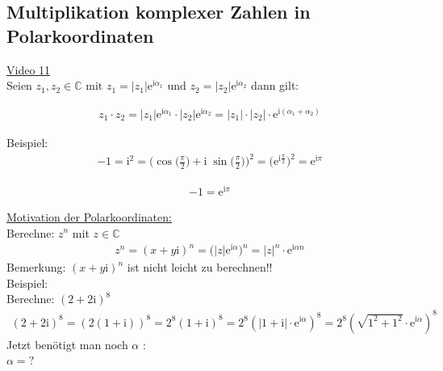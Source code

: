 \subsection{Multiplikation komplexer Zahlen in Polarkoordinaten}
\href{https://youtu.be/4eKWaZxQxvY}{Video 11}\\
Seien $ z_1,z_2 \in  \mathbb{C} \text{ mit } z_1=|z_1|\mathrm{e}^{\mathrm{i}\alpha_1} \text{ und }z_2=|z_2|\mathrm{e}^{\mathrm{i}\alpha_2} $ dann gilt:\\
\begin{center}
	\begin{align*}
	\boxed{z_1\cdot z_2=|z_1|\mathrm{e}^{\mathrm{i}\alpha_1}\cdot |z_2|\mathrm{e}^{\mathrm{i}\alpha_2}=|z_1|\cdot|z_2|\cdot \mathrm{e}^{\mathrm{i}(\alpha_1+\alpha_2)}}
	\end{align*}
\end{center}
\newpage
\noindent
Beispiel:\\
\begin{align*}
-1=\mathrm{i}^2=\bigg(\cos\bigg(\frac{\pi}{2}\bigg)+\mathrm{i}\;\sin\bigg(\frac{\pi}{2}\bigg)\bigg)^2=\big(\mathrm{e}^{\mathrm{i}\frac{\pi}{2}}\big)^2=\mathrm{e}^{\mathrm{i}\pi}
\end{align*}
\begin{center}
	\begin{align*}
	\boxed{-1=\mathrm{e}^{\mathrm{i}\pi}}
	\end{align*}
\end{center}
\underline {Motivation der Polarkoordinaten:}\\
Berechne: $ z^n $ mit $ z \in  \mathbb{C} $\\
\begin{align*}
z^n=(x+y\mathrm{i})^n=\big(|z|\mathrm{e}^{\mathrm{i}\alpha}\big)^n=|z|^n\cdot \mathrm{e}^{\mathrm{i}\alpha n}
\end{align*}
Bemerkung: $ (x+y\mathrm{i})^n $ ist nicht leicht zu berechnen!!\vspace*{2mm}\\
Beispiel:\\
Berechne: $(2+2\mathrm{i})^8 $\\
\begin{align*}
(2+2\mathrm{i})^8=(2(1+\mathrm{i}))^8=2^8(1+\mathrm{i})^8=2^8(|1+\mathrm{i}|\cdot \mathrm{e}^{\mathrm{i}\alpha})^8=2^8(\sqrt{1^2+1^2}\cdot \mathrm{e}^{\mathrm{i}\alpha})^8
\end{align*}
Jetzt benötigt man noch $ \alpha $ :\\
$ \alpha=? $\\
